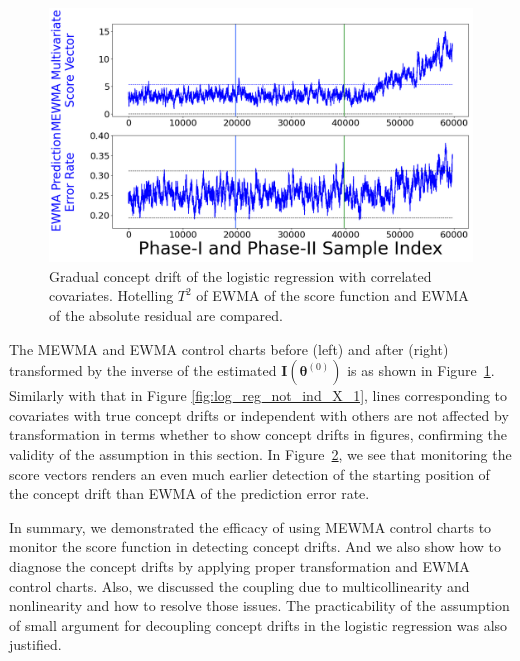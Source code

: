 \documentclass[twoside,11pt]{article}
\begin{document}
\begin{appendix}
\begin{enumerate}[(I)]
\begin{figure}[!htbp]
  \label{fig:log_reg_not_ind_X_grad_cd}
\end{figure}
\begin{figure}[!htbp]
\centering
\includegraphics[width = 0.6\linewidth]{../figures/v14/sim_7/logi_small/1_sim7_logi_1e-08_0_005_1.png}
  \caption{Gradual concept drift of the logistic regression with correlated covariates. Hotelling $T^2$ of EWMA of the score function and EWMA of the absolute residual are compared.}
  \label{fig:log_reg_ind_X_grad_cd_comp}
\end{figure}

The MEWMA and EWMA control charts before (left) and after (right) transformed by {the inverse of the estimated} ${\mathbf {I}}(\bm { \theta}^{(0)})$ is as shown in Figure~\ref{fig:log_reg_not_ind_X_grad_cd}. Similarly with that in Figure \ref{fig:log_reg_not_ind_X_1}, lines corresponding to covariates with true concept drifts or independent with others are not affected by transformation in terms whether to show concept drifts in figures, confirming the validity of the assumption in this section. In Figure~\ref{fig:log_reg_ind_X_grad_cd_comp}, we see that monitoring the score vectors renders an even much earlier detection of the starting position of the concept drift than EWMA of the prediction error rate.

In summary, we demonstrated the efficacy of using MEWMA control charts to monitor the score function in detecting concept drifts. And we also show how to diagnose the concept drifts by applying proper transformation and EWMA control charts. Also, we discussed the coupling due to multicollinearity and nonlinearity and how to resolve those issues. The practicability of the assumption of small argument for decoupling concept drifts in the logistic regression was also justified.


\end{enumerate}
\end{appendix}
\end{document}
